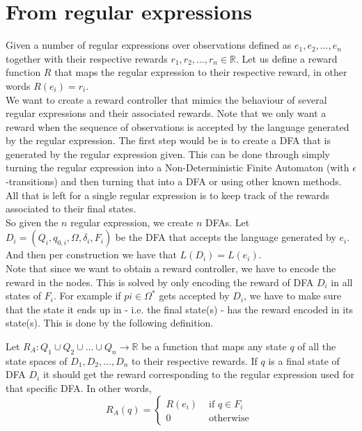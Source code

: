\section{From regular expressions}
\label{sec:rc-regex}
Given a number of regular expressions over observations defined as $e_1,e_2,\dots,e_n$ together with their respective rewards $r_1,r_2,\dots,r_n\in\mathbb{R}$. Let us define a reward function $R$ that maps the regular expression to their respective reward, in other words $R(e_i)=r_i$. \\

We want to create a reward controller that mimics the behaviour of several regular expressions and their associated rewards. Note that we only want a reward when the sequence of observations is accepted by the language generated by the regular expression. The first step would be is to create a DFA that is generated by the regular expression given. This can be done through simply turning the regular expression into a Non-Deterministic Finite Automaton (with $\epsilon$-transitions) and then turning that into a DFA or using other known methods\cite{p:regex-to-dfa}. All that is left for a single regular expression is to keep track of the rewards associated to their final states.\\

So given the $n$ regular expression, we create $n$ DFAs. Let $D_i=(Q_i,q_{0,i},\Omega, \delta_i,F_i)$ be the DFA that accepts the language generated by $e_i$. And then per construction we have that $L(D_i)=L(e_i)$. \\

Note that since we want to obtain a reward controller, we have to encode the reward in the nodes. This is solved by only encoding the reward of DFA $D_i$ in all states of $F_i$. For example if $pi\in\Omega^*$ gets accepted by $D_i$, we have to make sure that the state it ends up in - i.e. the final state(s) - has the reward encoded in its state(s). This is done by the following definition.
\begin{definition}
Let $R_A:Q_1\cup Q_2\cup\dots\cup Q_n\to\mathbb{R}$ be a function that maps any state $q$ of all the state spaces of $D_1,D_2,\dots,D_n$ to their respective rewards. If $q$ is a final state of DFA $D_i$ it should get the reward corresponding to the regular expression used for that specific DFA. In other words,
\begin{equation*}
R_A(q) = \begin{cases}
R(e_i) & \text{ if } q\in F_i \\
0 & \text{ otherwise }
\end{cases}
\end{equation*}
\label{d:associated_reward}
\end{definition}

